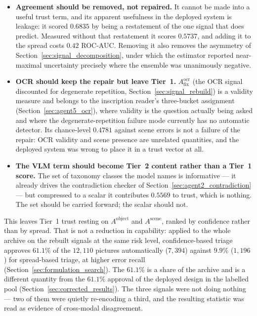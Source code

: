 \documentclass[12pt,a4paper]{report}
\begin{document}
\begin{itemize}
  \item \textbf{Agreement should be removed, not repaired.} It cannot be made into a useful
  trust term, and its apparent usefulness in the deployed system is leakage: it scored $0.6835$
  by being a restatement of the one signal that does predict. Measured without that restatement it scores
  $0.5737$, and adding it to the spread costs $0.42$ ROC-AUC. Removing it also removes the
  asymmetry of Section~\ref{sec:signal_decomposition}, under which the estimator reported
  near-maximal uncertainty precisely where the ensemble was unanimously negative.
  \item \textbf{OCR should keep the repair but leave Tier~1.} $A^{\text{ocr}}_{\text{fix}}$ (the OCR signal discounted for degenerate repetition, Section~\ref{sec:signal_rebuild}) is a validity measure and belongs to the inscription reader's three-bucket assignment
  (Section~\ref{sec:agent5_ocr}), where validity is the question actually being asked and where
  the degenerate-repetition failure mode currently has no automatic detector. Its chance-level
  $0.4781$ against scene errors is not a failure of the repair: OCR validity and scene presence
  are unrelated quantities, and the deployed system was wrong to place it in a trust vector at all.
  \item \textbf{The VLM term should become Tier~2 content rather than a Tier~1 score.} The set of
  taxonomy classes the model names is informative --- it already drives the contradiction checker of Section~\ref{sec:agent2_contradiction} --- but compressed to a scalar it contributes $0.5569$ to trust, which is
  nothing. The set should be carried forward; the scalar should not.
\end{itemize}

This leaves Tier~1 trust resting on $A^{\text{object}}$ and $A^{\text{scene}}$, ranked by
confidence rather than by spread. That is not a reduction in capability: applied to the whole archive on the rebuilt signals at the same risk level,
confidence-based triage approves $61.1\%$ of the $12{,}110$ pictures automatically ($7{,}394$) against $9.9\%$ ($1{,}196$)
for spread-based triage, at higher error recall (Section~\ref{sec:formulation_search}). The $61.1\%$ is a share of the archive and is a different quantity from the $61.1\%$ approval of the deployed design in the labelled pool (Section~\ref{sec:corrected_results}). The three signals were not doing nothing --- two
of them were quietly re-encoding a third, and the resulting statistic was read as evidence of
cross-modal disagreement.
\end{document}
